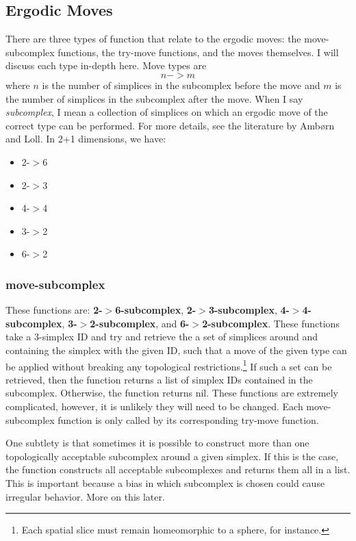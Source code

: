 \documentclass[12pt]{article}
\begin{document}
\subsection{Ergodic Moves}
There are three types of function that relate to the ergodic moves:
the move-subcomplex functions, the try-move functions, and the moves
themselves. I will discuss each type in-depth here. Move types are 
$$n->m$$
where $n$ is the number of simplices in the subcomplex before the move
and $m$ is the number of simplices in the subcomplex after the
move. When I say \textit{subcomplex}, I mean a collection of simplices
on which an ergodic move of the correct type can be performed. For
more details, see the literature by Amb\o rn and Loll. In 2+1
dimensions, we have:
\begin{itemize}
\item 2-$>$6
\item 2-$>$3
\item 4-$>$4
\item 3-$>$2
\item 6-$>$2
\end{itemize}

\subsubsection{move-subcomplex}

These functions are: \textbf{2-$>$6-subcomplex},
\textbf{2-$>$3-subcomplex}, \textbf{4-$>$4-subcomplex},
\textbf{3-$>$2-subcomplex}, and \textbf{6-$>$2-subcomplex}. These
functions take a 3-simplex ID and try and retrieve the a set of
simplices around and containing the simplex with the given ID, such
that a move of the given type can be applied without breaking any
topological restrictions.\footnote{Each spatial slice must remain
  homeomorphic to a sphere, for instance.} If such a set can be
retrieved, then the function returns a list of simplex IDs contained
in the subcomplex. Otherwise, the function returns nil. These
functions are extremely complicated, however, it is unlikely they will
need to be changed. Each move-subcomplex function is only called by
its corresponding try-move function.

One subtlety is that sometimes it is possible to construct more than
one topologically acceptable subcomplex around a given simplex. If
this is the case, the function constructs all acceptable subcomplexes
and returns them all in a list. This is important because a bias in
which subcomplex is chosen could cause irregular behavior. More on
this later.
\end{document}
